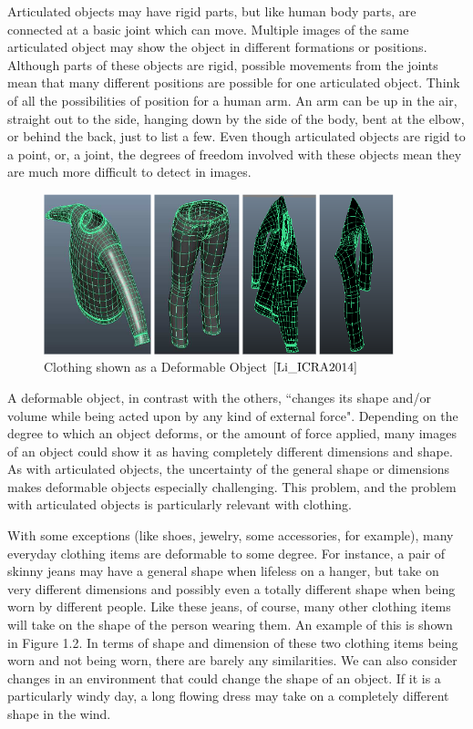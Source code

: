 \documentclass[12pt]{report} %
\begin{document}
	Articulated objects may have rigid parts, but like human body parts, are connected at a basic joint which can move\cite{szeliski2010computer}. Multiple images of the same articulated object may show the object in different formations or positions. Although parts of these objects are rigid, possible movements from the joints mean that many different positions are possible for one articulated object. Think of all the possibilities of position for a human arm. An arm can be up in the air, straight out to the side, hanging down by the side of the body, bent at the elbow, or behind the back, just to list a few. Even though articulated objects are rigid to a point, or, a joint, the degrees of freedom involved with these objects mean they are much more difficult to detect in images.
	
 \begin{figure}
\centering
\includegraphics[width=4in]{deformable} 
\caption[Clothing as a Deformable Object]
	{Clothing shown as a Deformable Object $\cite{Li_ICRA2014}$}
\end{figure}

	A deformable object, in contrast with the others, ``changes its shape and/or volume while being acted upon by any kind of external force"\cite{wolfram}. Depending on the degree to which an object deforms, or the amount of force applied, many images of an object could show it as having completely different dimensions and shape. As with articulated objects, the uncertainty of the general shape or dimensions makes deformable objects especially challenging. This problem, and the problem with articulated objects is particularly relevant with clothing. 
	
	With some exceptions (like shoes, jewelry, some accessories, for example), many everyday clothing items are deformable to some degree. For instance, a pair of skinny jeans may have a general shape when lifeless on a hanger, but take on very different dimensions and possibly even a totally different shape when being worn by different people. Like these jeans, of course, many other clothing items will take on the shape of the person wearing them. An example of this is shown in Figure 1.2\cite{Li_ICRA2014}. In terms of shape and dimension of these two clothing items being worn and not being worn, there are barely any similarities. We can also consider changes in an environment that could change the shape of an object. If it is a particularly windy day, a long flowing dress may take on a completely different shape in the wind.
\end{document}
